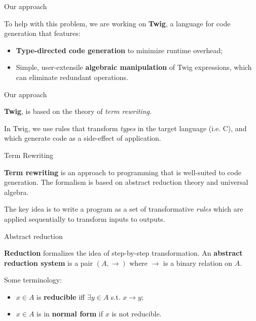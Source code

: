 \documentclass{beamer}
\begin{document}
\begin{frame}{Our approach}

To help with this problem, we are working on \textbf{Twig}, a language for
code generation that features:

\begin{itemize}

\item \textbf{Type-directed code generation} to minimize runtime overhead;

\item Simple, user-extensile \textbf{algebraic manipulation} of Twig
expressions, which can eliminate redundant operations.

\end{itemize}

\end{frame}


\begin{frame}{Our approach}

\textbf{Twig}, is based on the theory of \emph{term rewriting}.

In Twig, we use rules that transform \emph{types} in the target language (i.e.
C), and which generate code as a side-effect of application.

\end{frame}


\begin{frame}{Term Rewriting}

\textbf{Term rewriting} is an approach to programming that is well-suited to
code generation. The formalism is based on abstract reduction theory and
universal algebra.

The key idea is to write a program as a set of transformative \emph{rules}
which are applied sequentially to transform inputs to outputs.

\end{frame}


\begin{frame}{Abstract reduction}

\textbf{Reduction} formalizes the idea of step-by-step transformation. An
\textbf{abstract reduction system} is a pair $(A,\to)$ where $\to$ is a binary
relation on $A$.

Some terminology:

\begin{itemize}
  \item $x \in A$ is \textbf{reducible} iff $\exists y \in A$ s.t. $ x \to y$;
  \item $x \in A$ is in \textbf{normal form} if $x$ is not reducible.
\end{itemize}

\end{frame}
\end{document}
